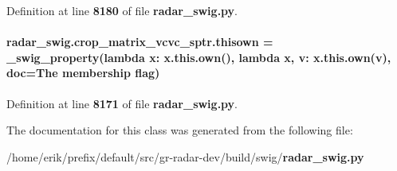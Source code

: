 Definition at line {\bf 8180} of file {\bf radar\+\_\+swig.\+py}.

\paragraph[{thisown}]{\setlength{\rightskip}{0pt plus 5cm}radar\+\_\+swig.\+crop\+\_\+matrix\+\_\+vcvc\+\_\+sptr.\+thisown = {\bf \+\_\+swig\+\_\+property}(lambda x\+: x.\+this.\+own(), lambda {\bf x}, v\+: x.\+this.\+own(v), doc=\textquotesingle{}The membership flag\textquotesingle{})\hspace{0.3cm}{\ttfamily [static]}}\label{classradar__swig_1_1crop__matrix__vcvc__sptr_a771ffed3a7899ff494b3e01823ef2797}


Definition at line {\bf 8171} of file {\bf radar\+\_\+swig.\+py}.



The documentation for this class was generated from the following file\+:\begin{DoxyCompactItemize}
\item 
/home/erik/prefix/default/src/gr-\/radar-\/dev/build/swig/{\bf radar\+\_\+swig.\+py}\end{DoxyCompactItemize}
